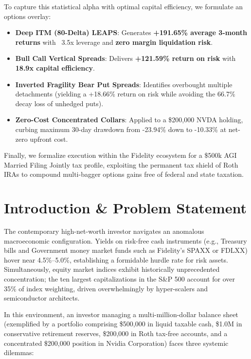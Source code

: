 \documentclass[11pt]{article}
\begin{document}
\begin{tcolorbox}[colback=lightgraybg,colframe=brandblue,title=\textbf{Executive Summary \& Abstract},fonttitle=\bfseries\color{white},arc=2mm]
To capture this statistical alpha with optimal capital efficiency, we formulate an options overlay:
\begin{itemize}
    \item \textbf{Deep ITM (80-Delta) LEAPS}: Generates \textbf{+191.65\% average 3-month returns} with ~3.5x leverage and \textbf{zero margin liquidation risk}.
    \item \textbf{Bull Call Vertical Spreads}: Delivers \textbf{+121.59\% return on risk} with \textbf{18.9x capital efficiency}.
    \item \textbf{Inverted Fragility Bear Put Spreads}: Identifies overbought multiple detachments (yielding a +18.66\% return on risk while avoiding the 66.7\% decay loss of unhedged puts).
    \item \textbf{Zero-Cost Concentrated Collars}: Applied to a \$200,000 NVDA holding, curbing maximum 30-day drawdown from -23.94\% down to -10.33\% at net-zero upfront cost.
\end{itemize}
Finally, we formalize execution within the Fidelity ecosystem for a \$500k AGI Married Filing Jointly tax profile, exploiting the permanent tax shield of Roth IRAs to compound multi-bagger options gains free of federal and state taxation.
\end{tcolorbox}

\vspace{0.4cm}

\section{Introduction \& Problem Statement}

The contemporary high-net-worth investor navigates an anomalous macroeconomic configuration. Yields on risk-free cash instruments (e.g., Treasury bills and Government money market funds such as Fidelity's SPAXX or FDLXX) hover near 4.5\%--5.0\%, establishing a formidable hurdle rate for risk assets. Simultaneously, equity market indices exhibit historically unprecedented concentration; the ten largest capitalizations in the S\&P 500 account for over 35\% of index weighting, driven overwhelmingly by hyper-scalers and semiconductor architects.

In this environment, an investor managing a multi-million-dollar balance sheet (exemplified by a portfolio comprising \$500,000 in liquid taxable cash, \$1.0M in conservative retirement reserves, \$200,000 in Roth tax-free accounts, and a concentrated \$200,000 position in Nvidia Corporation) faces three systemic dilemmas:
\end{document}
